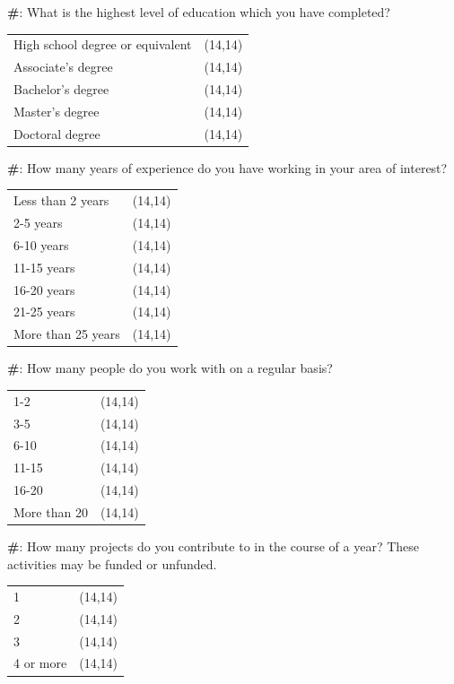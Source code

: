 \documentclass[12pt, letterpaper]{article}
\newcommand{\incrcounter}[1]{\addtocounter{#1}{1}}
\newcounter{questionnum}
\newcounter{subquestionnum}
\newcommand{\question}[2]{\setcounter{subquestionnum}{0} \textbf{\#\thequestionnum}: #1 #2}
\begin{document}
	\question{What is the highest level of education which you have completed?} {
		\begin{longtable}{l l}
		 	High school degree or equivalent & \framebox(14,14){} \\
		 	Associate's degree & \framebox(14,14){} \\
			Bachelor's degree & \framebox(14,14){} \\
		 	Master's degree & \framebox(14,14){} \\
		 	Doctoral degree & \framebox(14,14){} \\
		\end{longtable}	
	} \incrcounter{questionnum}
	
	\question{How many years of experience do you have working in your area of interest?}{
		\begin{longtable}{l l}
			 Less than 2 years & \framebox(14,14){} \\
			 2-5 years & \framebox(14,14){} \\
			 6-10 years & \framebox(14,14){} \\
			 11-15 years & \framebox(14,14){} \\
			 16-20 years & \framebox(14,14){} \\
			 21-25 years & \framebox(14,14){} \\
			 More than 25 years & \framebox(14,14){} \\
		\end{longtable}
	} \incrcounter{questionnum}
	
	\question{How many people do you work with on a regular basis?}{
		\begin{longtable}{l l}
			 1-2 & \framebox(14,14){} \\
			 3-5 & \framebox(14,14){} \\
			 6-10 & \framebox(14,14){} \\
			 11-15 & \framebox(14,14){} \\
			 16-20 & \framebox(14,14){} \\
			 More than 20 & \framebox(14,14){} \\
		\end{longtable}	
	} \incrcounter{questionnum}

	\pagebreak 
	
	\question{How many projects do you contribute to in the course of a year? These activities may be funded or unfunded.}{
		\begin{longtable}{l l}
			 1 & \framebox(14,14){} \\
			 2 & \framebox(14,14){} \\
			 3 & \framebox(14,14){} \\
			 4 or more & \framebox(14,14){} \\
		\end{longtable}
	} \incrcounter{questionnum}
	
\end{document}
